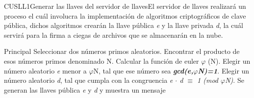 


\begin{UseCase}{CUSLL1}{Generar las llaves del servidor de llaves}{El servidor de llaves realizará un proceso el cuál involucra la implementación de algoritmos criptográficos de clave pública, dichos algoritmos crearán la  llave pública \textit{e} y la llave privada \textit{d}, la cuál servirá para la firma a ciegas de archivos que se almacenarán en la nube.}

				
\end{UseCase}


\begin{UCtrayectoria}{Principal}
	\UCpaso Seleccionar dos números primos aleatorios.  \label{CUSLL1Regreso}
	\UCpaso Encontrar el producto de esos números primos denominado N.
	\UCpaso Calcular la función de euler $\varphi $ (N).
	\UCpaso Elegir un número aleatorio \textit{e} menor a $\varphi${N}, tal que ese número sea \textbf{\textit{gcd(e,$\varphi${N})=1}}.  \label{CUSLL1Regreso2}
	\UCpaso Elegir un número aleatorio \textit{d}, tal que cumpla con la congruencia  \textit{e $\cdot$ d $\equiv$ 1 (mod $\varphi${N})}.  \label{CUSLL1Regreso3}
	\UCpaso Se generan las llaves pública \textit{e} y \textit{d} y muestra un mensaje 
\end{UCtrayectoria}

